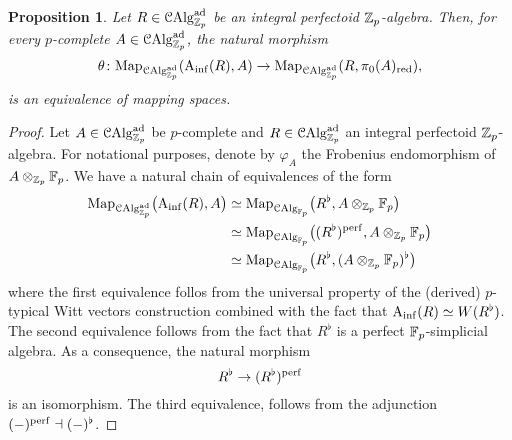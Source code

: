 \documentclass[10pt,a4paper]{amsart}
\numberwithin{equation}{subsection}
\newtheorem{proposition}[theorem]{Proposition}
\theoremstyle{definition}
\begin{document}
\begin{proposition} \label{Ainf_de_Rham}
    Let $R \in \mathcal C \mathrm{Alg}^{\mathrm{ad}}_{\mathbb Z_p}$ be an integral perfectoid $\mathbb Z_p$-algebra. Then, for every $p$-complete $A \in \mathcal C \mathrm{Alg}^{\mathrm{ad}}_{\mathbb Z_p}$, the natural morphism
        \[
               \theta \colon \mathrm{Map}_{\mathcal C \mathrm{Alg}^{\mathrm{ad}}_{\mathbb Z_p}}(\mathrm{A}_{\mathrm{inf}}(R), A) \to   \mathrm{Map}_{\mathcal C \mathrm{Alg}^{\mathrm{ad}}_{\mathbb Z_p}}(R, \pi_0(A)_\mathrm{red}) ,
        \]
    is an equivalence of mapping spaces.
\end{proposition}

\begin{proof} Let $A \in \mathcal C \mathrm{Alg}^{\mathrm{ad}}_{\mathbb Z_p}$ be $p$-complete and $R \in \mathcal C \mathrm{Alg}^{\mathrm{ad}}_{\mathbb Z_p}$ an integral perfectoid $\mathbb Z_p$-algebra. For notational purposes, denote by $\varphi_A$ the Frobenius endomorphism of $A \otimes_{\mathbb Z_p} \mathbb F_p$.
    We have a natural chain of equivalences of the form
        \begin{align*}
            \mathrm{Map}_{\mathcal C \mathrm{Alg}^{\mathrm{ad}}_{\mathbb Z_p}} \big( \mathrm{A}_{\mathrm{inf}}(R), A \big) & \simeq \mathrm{Map}_{\mathcal{C}\mathrm{Alg}_{\mathbb F_p}} \big( R^\flat, A \otimes_{\mathbb Z_p} \mathbb F_p \big) \\
                                                   & \simeq \mathrm{Map}_{\mathcal{C}\mathrm{Alg}_{\mathbb F_p}} \big( (R^\flat)^{\mathrm{perf}}, A \otimes_{\mathbb Z_p} \mathbb F_p \big) \\
                                                   & \simeq \mathrm{Map}_{\mathcal{C}\mathrm{Alg}_{\mathbb F_p}} \big( R^\flat, (A \otimes_{\mathbb Z_p} \mathbb F_p)^\flat \big)
        \end{align*}
    where the first equivalence follos from the universal property of the (derived) $p$-typical Witt vectors construction combined with the fact that $\mathrm{A}_{\mathrm{inf}}(R) \simeq W(R^\flat)$. The second equivalence follows from the fact that $R^\flat$ is a perfect $\mathbb F_p$-simplicial algebra. As a consequence, the natural morphism
        \[
           R^\flat \to ( R^\flat )^{\mathrm{perf}} 
        \]
    is an isomorphism. The third equivalence, follows from the adjunction $(-)^{\mathrm{perf}} \dashv (-)^\flat$.


\end{proof}
\end{document}

